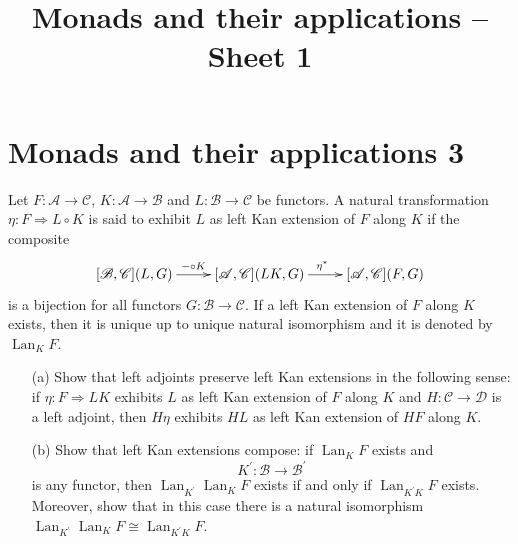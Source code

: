 \documentclass[12pt, a4paper]{article}
\date{}
\title{Monads and their applications -- Sheet 1}
\DeclareMathOperator{\Lan}{Lan}
\newcommand{\ca}[1]{\mathscr{#1}}
\theoremstyle{plain}
\theoremstyle{definition}
\theoremstyle{citing}
\theoremstyle{citingdfn}
\numberwithin{equation}{section}
\begin{document}

\pagestyle{empty}
\section*{Monads and their applications 3}

\begin{question} 
 Let $F \colon \ca{A} \rightarrow \ca{C}$, $K \colon \ca{A} \rightarrow \ca{B}$ and $L \colon \ca{B} \rightarrow \ca{C}$ be functors. A natural transformation $\eta \colon F \Rightarrow L \circ K$ is said to exhibit $L$ as left Kan extension of $F$ along $K$ if the composite
 \[
 \xymatrix{ [\ca{B}, \ca{C}](L,G) \ar[r]^-{- \circ K} & [\ca{A},\ca{C}](LK,G) \ar[r]^{\eta^{\ast}} & [\ca{A},\ca{C}](F,G)}
 \]
 is a bijection for all functors $G \colon \ca{B} \rightarrow \ca{C}$. If a left Kan extension of $F$ along $K$ exists, then it is unique up to unique natural isomorphism and it is denoted by $\Lan_K F$.
  \begin{enumerate}
   \item[(a)] Show that left adjoints preserve left Kan extensions in the following sense: if $\eta \colon F \Rightarrow LK$ exhibits $L$  as left Kan extension of $F$ along $K$ and $H \colon \ca{C} \rightarrow \ca{D}$ is a left adjoint, then $H\eta$ exhibits $HL$ as left Kan extension of $HF$ along $K$.
   
   \item[(b)] Show that left Kan extensions compose: if $\Lan_K F$ exists and 
   \[
   K^{\prime} \colon \ca{B} \rightarrow \ca{B}^{\prime}
   \]
   is any functor, then $\Lan_{K^{\prime}} \Lan_K F$ exists if and only if $\Lan_{K^{\prime} K} F$ exists. Moreover, show that in this case there is a natural isomorphism $\Lan_{K^{\prime}} \Lan_K F \cong \Lan_{K^{\prime} K} F$.
  \end{enumerate}
\end{question}
\end{document}
